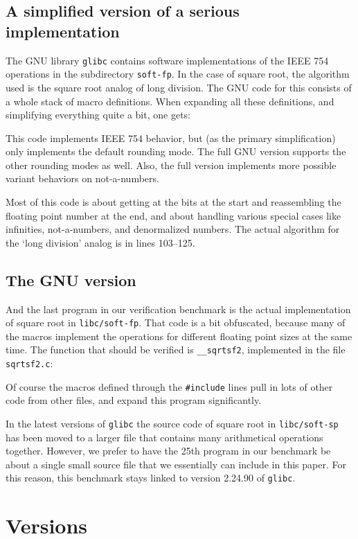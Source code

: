 \documentclass{article}
\begin{document}
\subsection{A simplified version of a serious implementation}
The GNU library \texttt{glibc} contains software implementations of
the IEEE 754 operations in the subdirectory \texttt{soft-fp}.
In the case of square root, the algorithm used is the square root
analog of long division.
The GNU code for this consists of a whole stack of macro definitions.
When expanding all these definitions, and simplifying everything quite a bit, one gets:

This code implements IEEE 754 behavior, but (as the primary simplification)
only implements the default rounding mode.
The full GNU version supports the other rounding modes as well.
Also, the full version implements more possible variant behaviors on not-a-numbers.

Most of this code is about getting at the bits at the start and reassembling the
floating point number at the end, and about
handling various special cases like infinities, not-a-numbers, and
denormalized numbers.
The actual algorithm for the `long division' analog
is in lines 103--125.

\subsection{The GNU version}
And the last program in our verification benchmark is the actual implementation
of square root in \texttt{libc/soft-fp}.
That code is a bit obfuscated, because many of the macros implement the operations
for different floating point sizes at the same time.
The function that should be verified is \lstinline|__sqrtsf2|,
implemented in the file \lstinline|sqrtsf2.c|:

Of course the macros defined through the \lstinline|#include| lines pull in lots of other code from other files, and expand this program significantly.

In the latest versions of \texttt{glibc} the source code of square root in \texttt{libc/soft-sp} has been moved to a larger file that contains many arithmetical operations together.
However, we prefer to have the 25th program in our benchmark be about a single small source file that we essentially can include in this paper.
For this reason, this benchmark stays linked to version 2.24.90 of \texttt{glibc}.

\section{Versions}
\end{document}
